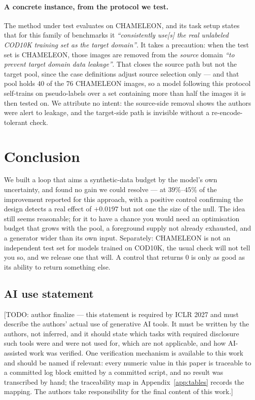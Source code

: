 \documentclass{article} %
\begin{document}
\paragraph{A concrete instance, from the protocol we test.} The method under test evaluates on
CHAMELEON, and its task setup states that for this family of benchmarks it \emph{``consistently use[s] the real
unlabeled COD10K training set as the target domain''}. It takes a precaution: when the test set is
CHAMELEON, those images are removed from the \emph{source} domain \emph{``to prevent target domain
data leakage''}. That closes the source path but not the target pool, since the case definitions adjust source
selection only --- and that pool holds $40$ of the $76$ CHAMELEON images, so a model following this
protocol self-trains on pseudo-labels over a set containing more than half the images it is then
tested on. We attribute no intent: the source-side removal shows the authors were alert to leakage,
and the target-side path is invisible without a re-encode-tolerant check.

\section{Conclusion}
\label{sec:conclusion}

We built a loop that aims a synthetic-data budget by the model's own uncertainty, and found no gain
we could resolve --- at $39\%$--$45\%$ of the improvement reported for this approach, with a positive
control confirming the design detects a real effect of $+0.0197$ but not one the size of the
null. The idea still seems reasonable; for it to have a chance you would need an optimisation budget that
grows with the pool, a foreground supply not already exhausted, and a generator wider than its own
input. Separately: CHAMELEON is not an independent test set for models trained on
COD10K, the usual check will not tell you so, and we release one that will. A control that returns $0$ is only as good as its
ability to return something else.

\subsection*{AI use statement}

[TODO: author finalize --- this statement is required by ICLR 2027 and must describe the authors'
actual use of generative AI tools. It must be written by the authors, not inferred, and it should
state which tasks with required disclosure such tools were and were not used for, which are not
applicable, and how AI-assisted work was verified. One verification mechanism is available to this
work and should be named if relevant: every numeric value in this paper is traceable to a committed
log block emitted by a committed script, and no result was transcribed by hand; the traceability map
in Appendix~\ref{app:tables} records the mapping. The authors take responsibility for the final
content of this work.]
\end{document}
